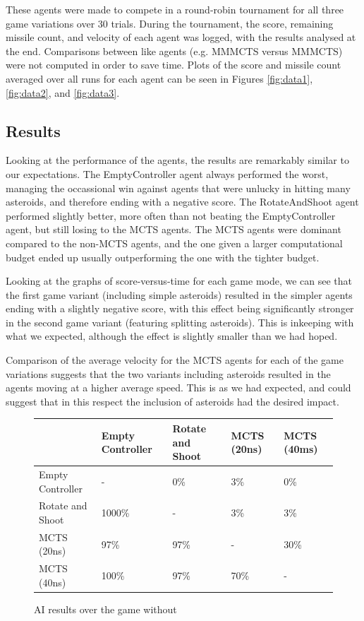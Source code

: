 These agents were made to compete in a round-robin tournament for all three game variations over 30 trials. During the tournament, the score, remaining missile count, and velocity of each agent was logged, with the results analysed at the end. Comparisons between like agents (e.g. MMMCTS versus MMMCTS) were not computed in order to save time. Plots of the score and missile count averaged over all runs for each agent can be seen in Figures \ref{fig:data1}, \ref{fig:data2}, and \ref{fig:data3}.

\subsection{Results}

Looking at the performance of the agents, the results are remarkably similar to our expectations. The EmptyController agent always performed the worst, managing the occassional win against agents that were unlucky in hitting many asteroids, and therefore ending with a negative score. The RotateAndShoot agent performed slightly better, more often than not beating the EmptyController agent, but still losing to the MCTS agents. The MCTS agents were dominant compared to the non-MCTS agents, and the one given a larger computational budget ended up usually outperforming the one with the tighter budget.

Looking at the graphs of score-versus-time for each game mode, we can see that the first game variant (including simple asteroids) resulted in the simpler agents ending with a slightly negative score, with this effect being significantly stronger in the second game variant (featuring splitting asteroids). This is inkeeping with what we expected, although the effect is slightly smaller than we had hoped.

Comparison of the average velocity for the MCTS agents for each of the game variations suggests that the two variants including asteroids resulted in the agents moving at a higher average speed. This is as we had expected, and could suggest that in this respect the inclusion of asteroids had the desired impact.

\begin{figure}
	\caption{AI results over the game without}
	\begin{tabular}{p{7.5em} | p{4.5em} p{4.5em} p{4.5em} p{4.5em}}
		&
			Empty Controller &
			Rotate and Shoot &
			MCTS (20ns) &
			MCTS (40ms) \\ \hline
		Empty Controller &
			-&
			0\% &
			3\% &
			0\% \\
		Rotate and Shoot &
			1000\% &
			-&
			3\% &
			3\% \\ 
		MCTS (20ns) &
			97\% &
			97\% &
			-&
			30\% \\
		MCTS (40ns) &
			100\% &
			97\% &
			70\% &
			-\\
	\end{tabular}
\end{figure}

